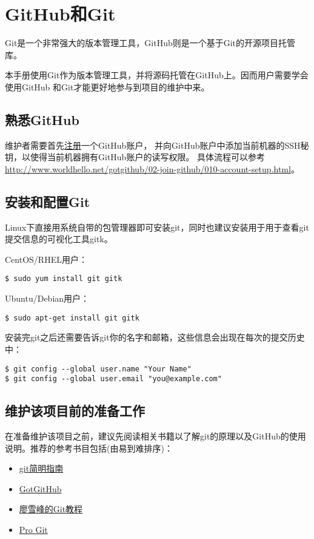 \section{GitHub和Git}
Git是一个非常强大的版本管理工具，GitHub则是一个基于Git的开源项目托管库。

本手册使用Git作为版本管理工具，并将源码托管在GitHub上。因而用户需要学会使用GitHub
和Git才能更好地参与到项目的维护中来。

\subsection{熟悉GitHub}
维护者需要首先\href{https://github.com/join}{注册}一个GitHub账户，
并向GitHub账户中添加当前机器的SSH秘钥，以使得当前机器拥有GitHub账户的读写权限。
具体流程可以参考
\url{http://www.worldhello.net/gotgithub/02-join-github/010-account-setup.html}。

\subsection{安装和配置Git}
Linux下直接用系统自带的包管理器即可安装git，同时也建议安装用于用于查看git提交信息的可视化工具gitk。

CentOS/RHEL用户：
\begin{verbatim}
$ sudo yum install git gitk
\end{verbatim}

Ubuntu/Debian用户：
\begin{verbatim}
$ sudo apt-get install git gitk
\end{verbatim}

安装完git之后还需要告诉git你的名字和邮箱，这些信息会出现在每次的提交历史中：
\begin{verbatim}
$ git config --global user.name "Your Name"
$ git config --global user.email "you@example.com"
\end{verbatim}

\subsection{维护该项目前的准备工作}
在准备维护该项目之前，建议先阅读相关书籍以了解git的原理以及GitHub的使用说明。推荐的参考书目包括(由易到难排序)：
\begin{itemize}
\item \href{http://rogerdudler.github.io/git-guide/index.zh.html}{git简明指南}
\item \href{http://www.worldhello.net/gotgithub/index.html}{GotGitHub}
\item \href{http://www.liaoxuefeng.com/wiki/0013739516305929606dd18361248578c67b8067c8c017b000}{廖雪峰的Git教程}
\item \href{https://git-scm.com/book/zh/v2}{Pro Git}
\end{itemize}

